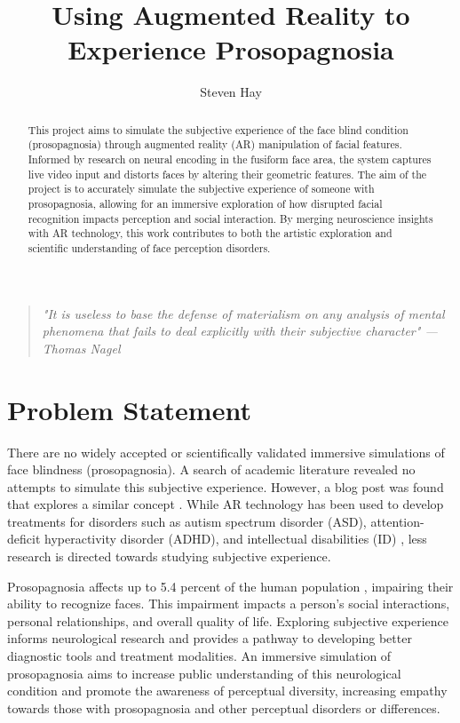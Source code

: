 \documentclass{article}
\title{
    Using Augmented Reality to Experience Prosopagnosia
}
\author{Steven Hay}
\begin{document}
    \maketitle
    
    \begin{abstract}
        This project aims to simulate the subjective experience of the face blind condition (prosopagnosia) through augmented reality (AR) manipulation of facial features. Informed by research on neural encoding in the fusiform face area, the system captures live video input and distorts faces by altering their geometric features. The aim of the project is to accurately simulate the subjective experience of someone with prosopagnosia, allowing for an immersive exploration of how disrupted facial recognition impacts perception and social interaction. By merging neuroscience insights with AR technology, this work contributes to both the artistic exploration and scientific understanding of face perception disorders.
    \end{abstract}

    \begin{quotation}
        \textit{"It is useless to base the defense of materialism on any analysis of mental phenomena that fails to deal explicitly with their subjective character" \nocite{nagel_1974} \hspace{1em plus 1fill}---Thomas Nagel}
    \end{quotation}
    
    \section{Problem Statement}
    There are no widely accepted or scientifically validated immersive simulations of face blindness (prosopagnosia). A search of academic literature revealed no attempts to simulate this subjective experience. However, a blog post was found that explores a similar concept \cite{bieber_2021}. While AR technology has been used to develop treatments for disorders such as autism spectrum disorder (ASD), attention-deficit hyperactivity disorder (ADHD), and intellectual disabilities (ID) \cite{bakir_2023}, less research is directed towards studying subjective experience.
    
    Prosopagnosia affects up to 5.4 percent of the human population \cite{degutis_2023}, impairing their ability to recognize faces. This impairment impacts a person's social interactions, personal relationships, and overall quality of life. Exploring subjective experience informs neurological research and provides a pathway to developing better diagnostic tools and treatment modalities. An immersive simulation of prosopagnosia aims to increase public understanding of this neurological condition and promote the awareness of perceptual diversity, increasing empathy towards those with prosopagnosia and other perceptual disorders or differences.
        
\end{document}

